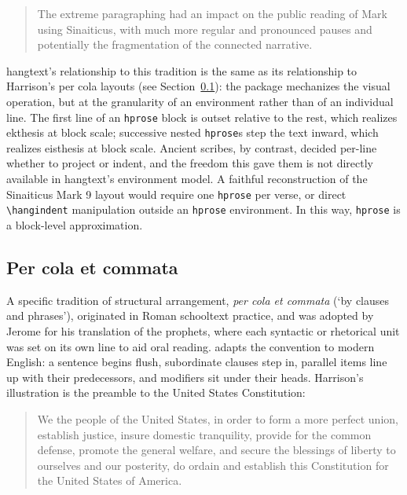 \documentclass[11pt, twoside, openany]{article}
\newcommand{\pkg}[1]{\textsf{#1}}
\newcommand{\env}[1]{\texttt{#1}}
\newcommand{\cs}[1]{\texttt{\textbackslash #1}}
\begin{document}
\begin{quote}
    The extreme paragraphing had an impact on the public reading of Mark using Sinaiticus, with much more regular and pronounced pauses and potentially the fragmentation of the connected narrative.
\end{quote} 

\pkg{hangtext}'s relationship to this tradition is the same as its relationship to Harrison's per cola layouts (see Section~\ref{sec:percola}): the package mechanizes the visual operation, but at the granularity of an environment rather than of an individual line. The first line of an \env{hprose} block is outset relative to the rest, which realizes ekthesis at block scale; successive nested \env{hprose}s step the text inward, which realizes eisthesis at block scale. Ancient scribes, by contrast, decided per-line whether to project or indent, and the freedom this gave them is not directly available in \pkg{hangtext}'s environment model. A faithful reconstruction of the Sinaiticus Mark 9 layout would require one \env{hprose} per verse, or direct \cs{hangindent} manipulation outside an \env{hprose} environment. In this way, \env{hprose} is a block-level approximation.

\subsection{Per cola et commata}\label{sec:percola}

A specific tradition of structural arrangement, \emph{per cola et commata} (`by clauses and phrases'), originated in Roman schooltext practice, and was adopted by Jerome for his translation of the prophets, where each syntactic or rhetorical unit was set on its own line to aid oral reading. \cite{harrison2007} adapts the convention to modern English: a sentence begins flush, subordinate clauses step in, parallel items line up with their predecessors, and modifiers sit under their heads. Harrison's illustration is the preamble to the United States Constitution:

\begin{quote}
    We the people of the United States, in order to form a more perfect union, establish justice, insure domestic tranquility, provide for the common defense, promote the general welfare, and secure the blessings of liberty to ourselves and our posterity, do ordain and establish this Constitution for the United States of America.
\end{quote}
\end{document}
